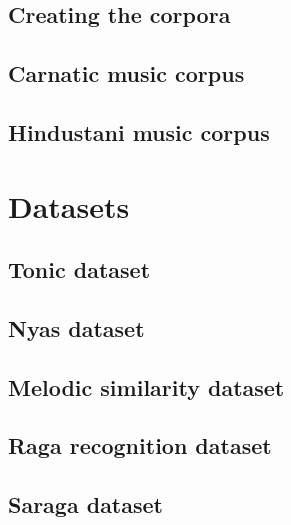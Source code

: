 \subsection{Creating the corpora}

\subsection{Carnatic music corpus}

\subsection{Hindustani music corpus}

\section{Datasets}

\subsection{Tonic dataset}

\subsection{Nyas dataset}

\subsection{Melodic similarity dataset}

\subsection{Raga recognition dataset}

\subsection{Saraga dataset}








